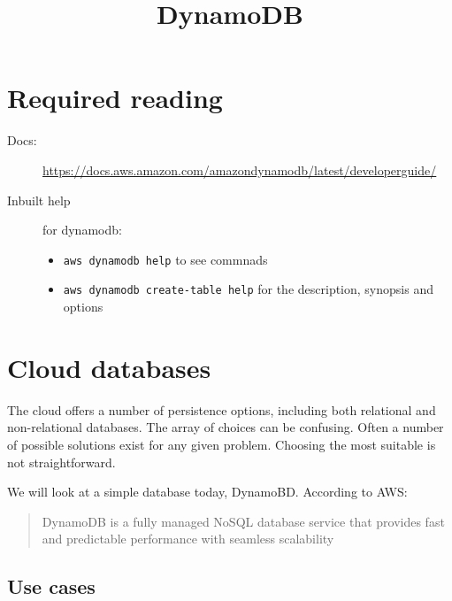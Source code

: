 \documentclass[slides]{pgnotes}
\title{DynamoDB}
\begin{document}
\maketitle

\tableofcontents

\section*{Required reading}\label{sec:required-reading}

\begin{description}
\item[Docs:]
\url{https://docs.aws.amazon.com/amazondynamodb/latest/developerguide/}
\item[Inbuilt help]
for dynamodb:

\begin{itemize}
\item
  \texttt{aws\ dynamodb\ help} to see commnads
\item
  \texttt{aws\ dynamodb\ create-table\ help} for the description,
  synopsis and options
\end{itemize}
\end{description}

\section{Cloud databases}\label{sec:cloud-databases}

The cloud offers a number of persistence options, including both
relational and non-relational databases. The array of choices can be
confusing. Often a number of possible solutions exist for any given
problem. Choosing the most suitable is not straightforward.

We will look at a simple database today, DynamoBD. According to AWS:

\begin{quote}
DynamoDB is a fully managed NoSQL database service that provides fast
and predictable performance with seamless scalability
\end{quote}

\subsection{Use cases}
\end{document}
